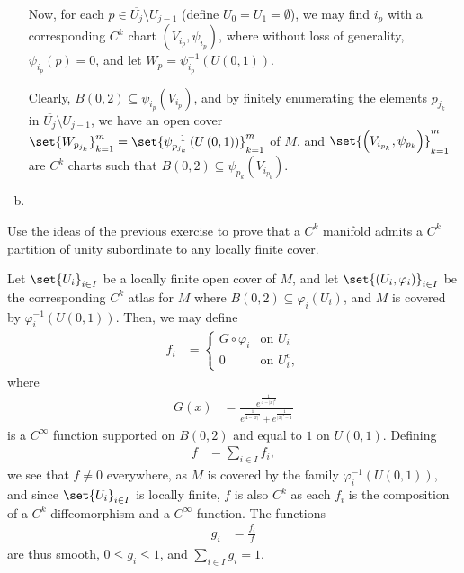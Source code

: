 \documentclass[10pt]{mypackage}
\begin{document}
\begin{solution}
\begin{enumerate}[(a)]
      Now, for each $p\in \overline{U_{j}}\setminus U_{j-1}$ (define $U_{0} = U_{1} = \emptyset$), we may find $i_p$ with a corresponding $C^{k}$ chart $\left( V_{i_p},\psi_{i_p} \right)$, where without loss of generality, $\psi_{i_p}\left( p \right) = 0$, and let $W_p = \psi_{i_p}^{-1}\left( U\left( 0,1 \right) \right)$.\newline

      Clearly, $B\left( 0,2 \right)\subseteq \psi_{i_p}\left( V_{i_p} \right)$, and by finitely enumerating the elements $p_{j_k}$ in $ \overline{U_{j}}\setminus U_{j-1} $, we have an open cover $\set{W_{p_{j_k}}}_{k=1}^{m} = \set{\psi_{p_{j_k}}^{-1}\left( U\left( 0,1 \right) \right)}_{k=1}^{m}$ of $M$, and $\set{\left( V_{i_{p_k}},\psi_{p_k} \right)}_{k=1}^{m}$ are $ C^{k}$ charts such that $B\left( 0,2 \right)\subseteq \psi_{p_k}\left( V_{i_{p_k}} \right)$.
    \item 
  \end{enumerate}
\end{solution}
\begin{problem}[Problem 6]
  Use the ideas of the previous exercise to prove that a $C^{k}$ manifold admits a $C^{k}$ partition of unity subordinate to any locally finite cover.
\end{problem}
\begin{solution}
  Let $\set{U_i}_{i\in I}$ be a locally finite open cover of $M$, and let $\set{\left( U_i,\varphi_i \right)}_{i\in I}$ be the corresponding $C^{k}$ atlas for $M$ where $B\left( 0,2 \right)\subseteq \varphi_{i} \left( U_i \right)$, and $M$ is covered by $\varphi_{i}^{-1}\left( U\left( 0,1 \right) \right)$. Then, we may define
  \begin{align*}
    f_i &= \begin{cases}
      G\circ \varphi_i & \text{on $U_i$}\\
      0 & \text{on $U_i^{c}$},
    \end{cases}
  \end{align*}
  where
  \begin{align*}
    G(x) &= \frac{e^{\frac{1}{4-\left\vert x \right\vert^2}}}{e^{\frac{1}{4-\left\vert x \right\vert^2}} + e^{ \frac{1}{\left\vert x \right\vert^2 - 1} }}
  \end{align*}
  is a $C^{\infty}$ function supported on $B\left( 0,2 \right)$ and equal to $1$ on $U\left( 0,1 \right)$. Defining
  \begin{align*}
    f &= \sum_{i\in I} f_i,
  \end{align*}
  we see that $f\neq 0$ everywhere, as $M$ is covered by the family $\varphi_{i}^{-1}\left( U\left( 0,1 \right) \right)$, and since $\set{U_i}_{i\in I}$ is locally finite, $f$ is also $C^{k}$ as each $f_i$ is the composition of a $C^{k}$ diffeomorphism and a $C^{\infty}$ function. The functions
  \begin{align*}
    g_i &= \frac{f_i}{f}
  \end{align*}
  are thus smooth, $0\leq g_i \leq 1$, and $\sum_{i\in I} g_i = 1$.
\end{solution}
\end{document}
